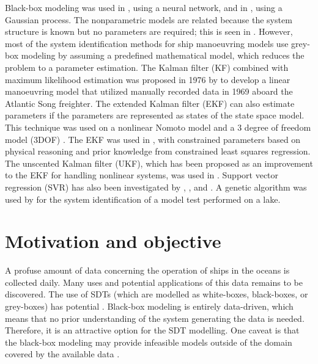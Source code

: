 Black-box modeling was used in \textcite{he_nonparametric_2022}, using a neural network, and in \textcite{xue_identification_2021}, using a Gaussian process. The nonparametric models are related because the system structure is known but no parameters are required; this is seen in \textcite{pongduang_nonparametric_2020}. However, most of the system identification methods for ship manoeuvring models use grey-box modeling by assuming a predefined mathematical model, which reduces the problem to a parameter estimation.
The Kalman filter (KF) combined with maximum likelihood estimation was proposed in 1976 by \textcite{astrom_identification_1976} to develop a linear manoeuvring model that utilized manually recorded data in 1969 aboard the Atlantic Song freighter. The extended Kalman filter (EKF) can also estimate parameters if the parameters are represented as states of the state space model. This technique was used on a nonlinear Nomoto model \cite{perera_system_2015} and a 3 degree of freedom model (3DOF) \cite{shi_identification_2009}. The EKF was used in \textcite{araki_estimating_2012}, with constrained parameters based on physical reasoning and prior knowledge from constrained least squares regression. The unscented Kalman filter (UKF), which has been proposed as an improvement to the EKF for handling nonlinear systems, was used in \textcite{revestido_herrero_two-step_2012}.
Support vector regression (SVR) has also been investigated by \textcite{luo_parameter_2016}, \textcite{zhu_parameter_2017}, and \textcite{wang_parameter_2021}. A genetic algorithm was used by \textcite{miller_ship_2021} for the system identification of a model test performed on a lake.





\section{Motivation and objective}
\label{sec:motivation}
A profuse amount of data concerning the operation of ships in the oceans is collected daily. Many uses and potential applications of this data remains to be discovered. The use of SDTs (which are modelled as white-boxes, black-boxes, or grey-boxes) has potential .
Black-box modeling is entirely data-driven, which means that no prior understanding of the system generating the data is needed. Therefore, it is an attractive option for the SDT modelling. One caveat is that the black-box modeling may provide infeasible models outside of the domain covered by the available data \cite{nielsen_machine_2022}. 

